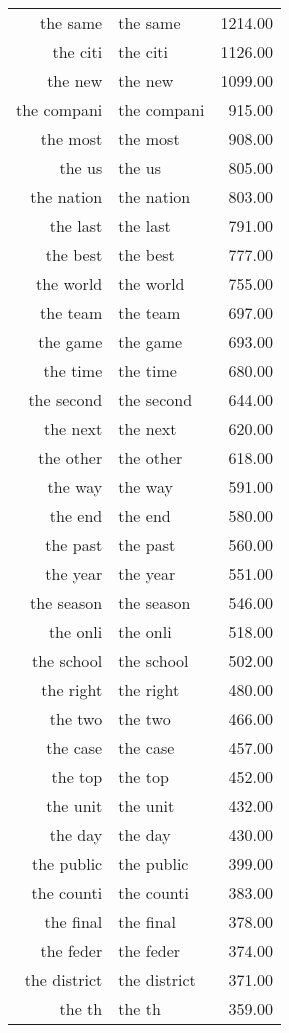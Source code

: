 \begin{table}[ht]
\begin{tabular}{rlr}
  the same & the same & 1214.00 \\ 
  the citi & the citi & 1126.00 \\ 
  the new & the new & 1099.00 \\ 
  the compani & the compani & 915.00 \\ 
  the most & the most & 908.00 \\ 
  the us & the us & 805.00 \\ 
  the nation & the nation & 803.00 \\ 
  the last & the last & 791.00 \\ 
  the best & the best & 777.00 \\ 
  the world & the world & 755.00 \\ 
  the team & the team & 697.00 \\ 
  the game & the game & 693.00 \\ 
  the time & the time & 680.00 \\ 
  the second & the second & 644.00 \\ 
  the next & the next & 620.00 \\ 
  the other & the other & 618.00 \\ 
  the way & the way & 591.00 \\ 
  the end & the end & 580.00 \\ 
  the past & the past & 560.00 \\ 
  the year & the year & 551.00 \\ 
  the season & the season & 546.00 \\ 
  the onli & the onli & 518.00 \\ 
  the school & the school & 502.00 \\ 
  the right & the right & 480.00 \\ 
  the two & the two & 466.00 \\ 
  the case & the case & 457.00 \\ 
  the top & the top & 452.00 \\ 
  the unit & the unit & 432.00 \\ 
  the day & the day & 430.00 \\ 
  the public & the public & 399.00 \\ 
  the counti & the counti & 383.00 \\ 
  the final & the final & 378.00 \\ 
  the feder & the feder & 374.00 \\ 
  the district & the district & 371.00 \\ 
  the th & the th & 359.00 \\ 

\end{tabular}
\end{table}
